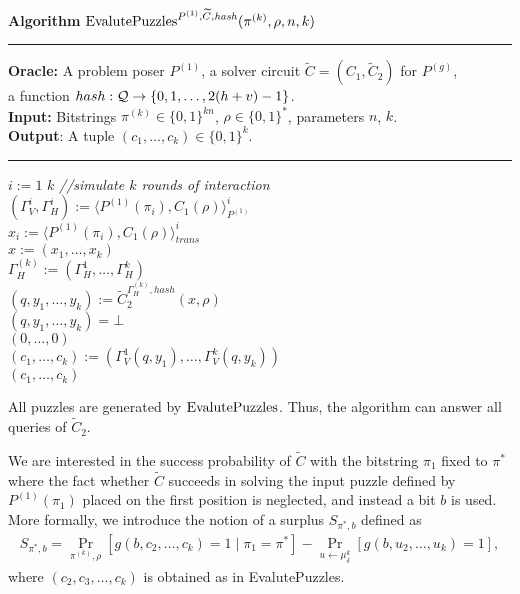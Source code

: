 \begin{codeblock}
  \textbf{Algorithm} $\operatorname{\text{EvalutePuzzles}}^{P^{(1)}, \widetilde{C}, \operatorname{\mathit{hash}}}(\pi^{(k)}, \rho, n, k)$
  \medskip \hrule
  \textbf{Oracle:}  A problem poser $P^{(1)}$, a solver circuit $\widetilde{C} = (C_1, \widetilde{C}_2)$ for $P^{(g)}$,\\
  \IndII a function $hash : \mathcal{Q} \rightarrow \{0,1,\dots, 2(h+v)-1\}$.\\
  \textbf{Input:} Bitstrings $\pi^{(k)} \in \{0,1\}^{kn}$, $\rho \in \{0,1\}^{*}$, parameters $n$, $k$.\\
  \textbf{Output}: A tuple $(c_1, \dots, c_k) \in \{0,1\}^{k}$.
  \medskip\hrule
  \For $i:=1$ \To $k$ \Do \IndII \textit{//simulate $k$ rounds of interaction} \\
  \IndI $(\Gamma_V^{i}, \Gamma_H^{i}) := \langle P^{(1)}(\pi_i), C_1(\rho) \rangle_{P^{(1)}}^i$\\
  \IndI $x_i := \langle P^{(1)}(\pi_i), C_1(\rho) \rangle^i_{\mathit{trans}}$ \\
  $x := (x_1, \dots, x_k)$ \\
  $\Gamma_H^{(k)} := (\Gamma_H^1, \dotsc, \Gamma_H^k)$ \\
  $(q, y_1, \dots, y_k) := \widetilde{C}_2^{\Gamma_H^{(k)}, hash} (x, \rho)$ \\
  \If $(q, y_1, \dots, y_k) = \bot$ \Then \\
  \IndI \Return $(0, \dotsc, 0)$ \\
  $(c_1, \dotsc, c_k) := (\Gamma_V^{1}(q, y_1), \dotsc, \Gamma_V^{k}(q, y_k))$\\
  \Return $(c_1, \dotsc, c_k)$
\end{codeblock}
%
All puzzles are generated  by $\operatorname{\text{EvalutePuzzles}}$. Thus, the algorithm can answer all queries of $\widetilde{C}_2$.

We are interested in the success probability of $\widetilde{C}$ with the bitstring $\pi_1$ fixed to $\pi^*$ where
the fact whether $\widetilde{C}$ succeeds in solving the input puzzle defined by $P^{(1)}(\pi_1)$ placed on the first position is neglected,
and instead a bit $b$ is used. More formally, we introduce the notion of a surplus $S_{\pi^*, b}$ defined as
\begin{align}
  \label{eq:s_pi_b}
S_{\pi^*, b} = \underset{\pi^{(k)}, \rho}{\Pr}\left[g(b, c_2, \dots, c_k) = 1 \mid \pi_1 = \pi^*\right] - \underset{u \leftarrow \mu^{k}_{\delta}}{\Pr}\left[g(b, u_2, \dots, u_k) = 1\right],
\end{align}
where $(c_2, c_3, \dotsc, c_k)$ is obtained as in EvalutePuzzles.

